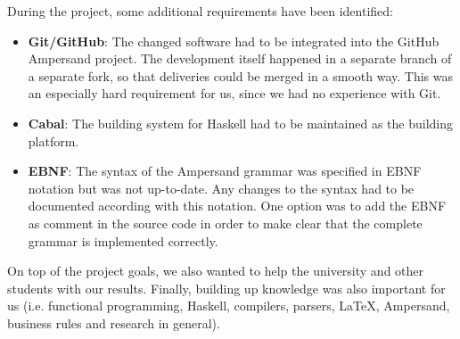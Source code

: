 During the project, some additional requirements have been identified:
\begin{itemize}
  \item \textbf{Git/GitHub}: The changed software had to be integrated into the GitHub Ampersand project.
    The development itself happened in a separate branch of a separate fork, so that deliveries could be merged in a smooth way.
    This was an especially hard requirement for us, since we had no experience with Git.
  \item \textbf{Cabal}: The building system for Haskell had to be maintained as the building platform.
  \item \textbf{EBNF}: The syntax of the Ampersand grammar was specified in EBNF notation but was not up-to-date.
    Any changes to the syntax had to be documented according with this notation.
    One option was to add the EBNF as comment in the source code in order to make clear that the complete grammar is implemented correctly.
\end{itemize}

On top of the project goals, we also wanted to help the university and other students with our results.
Finally, building up knowledge was also important for us (i.e. functional programming, Haskell, compilers, parsers, LaTeX, Ampersand, business rules and research in general).
